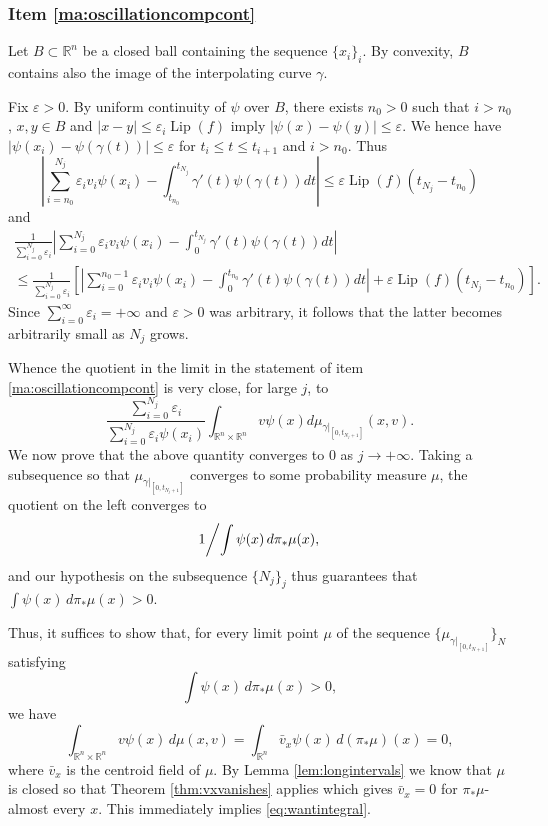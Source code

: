 \documentclass[11pt]{article}
\theoremstyle{definition}
\theoremstyle{remark}
\DeclareMathOperator{\lip}{Lip}
\newcommand{\R}{\mathbb{R}}
\renewcommand{\leq}{\leqslant}
\newcommand{\meas}[2]{\mu_{#1|_{#2}}}
\begin{document}
\subsubsection{Item \ref{ma:oscillationcompcont}}
\label{sec:proofmain1}
Let $B\subset\R^n$ be a closed ball containing the sequence $\{x_i\}_i$. By convexity, $B$ contains also the image of the interpolating curve $\gamma$.

Fix $\varepsilon>0$. By uniform continuity of $\psi$ over $B$, there exists $n_0>0$ such that $i>n_0$, $x,y\in B$ and $|x-y|\leq \varepsilon_i\lip(f)$ imply $|\psi(x)-\psi(y)|\leq \varepsilon$. We hence have $|\psi(x_i)-\psi(\gamma(t))|\leq\varepsilon$ for $t_i\leq t\leq t_{i+1}$ and $i>n_0$. Thus 
\[\left|\sum_{i=n_0}^{N_j}\varepsilon_iv_i\psi(x_i)-\int_{t_{n_0}}^{t_{N_j}}\gamma'(t)\psi(\gamma(t))dt\right|\leq \varepsilon \lip(f)(t_{N_j}-t_{n_0}) \]
and
\begin{multline*}
 \frac{1}{\sum_{i=0}^{N_j}\varepsilon_i}
 \left|\sum_{i=0}^{N_j}\varepsilon_iv_i\psi(x_i)-\int_{0}^{t_{N_j}}\gamma'(t)\psi(\gamma(t))dt\right|\\
 \leq \frac{1}{\sum_{i=0}^{N_j}\varepsilon_i}\left[\left|\sum_{i=0}^{n_0-1} \varepsilon_i v_i\psi(x_i)-\int_{0}^{t_{n_0}}\gamma'(t)\psi(\gamma(t))dt\right| +\varepsilon \lip(f)(t_{N_j}-t_{n_0})\right].
\end{multline*}
Since $\sum_{i=0}^\infty\varepsilon_i=+\infty$ and $\varepsilon > 0$ was arbitrary, it follows that the latter becomes arbitrarily small as $N_j$ grows. 

Whence the quotient in the limit in the statement of item \ref{ma:oscillationcompcont} is very close, for large $j$, to 
\[\frac{\sum_{i=0}^{N_j}\varepsilon_i}{\sum_{i=0}^{N_j}\varepsilon_i\psi(x_i)}\int_{\R^n\times\R^n}v\psi(x)d\meas{\gamma}{[0,t_{N_j+1}]}(x,v).\]
We now prove that the above quantity converges to 0  as $j\to+\infty$.
 Taking a subsequence so that $\meas{\gamma}{[0,t_{N_j+1}]}$ converges to some probability measure $\mu$, the quotient on the left converges to 
 \[\left.1\middle/\int \psi(x)\,d\pi_*\mu(x),\right.\] 
 and our hypothesis on the subsequence $\{N_j\}_j$ thus guarantees that $\int \psi(x)\,d\pi_*\mu(x)>0$. %
%
%
%
%
%


Thus, it suffices to show that, for every limit point $\mu$ of the sequence $\{\meas{\gamma}{[0,t_{N+1}]}\}_N$ satisfying $$\displaystyle \int \psi(x)\,d\pi_*\mu(x)>0,$$ we have
\begin{equation}\label{eq:wantintegral}
\int_{\R^n\times\R^n} v\psi(x)\,d\mu(x,v)=\int_{\R^n} \bar v_x\psi(x)\,d(\pi_*\mu)(x)=0,
\end{equation}
where $\bar v_x$ is the centroid field of $\mu$. By Lemma \ref{lem:longintervals} we know that $\mu$ is closed so that Theorem \ref{thm:vxvanishes} applies which gives  $\bar v_x=0$ for $\pi_*\mu$-almost every $x$. This immediately implies \eqref{eq:wantintegral}.
%
%
%
%
%
%
%
%
%
%
%
%
%
%
%
%
%
%
%
%
%
\end{document}
